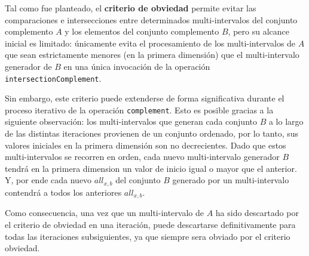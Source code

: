Tal como fue planteado, el \textbf{criterio de obviedad} permite evitar las comparaciones e intersecciones entre determinados multi-intervalos del conjunto complemento $A$ y los elementos del conjunto complemento $B$, pero su alcance inicial es limitado: únicamente evita el procesamiento de los multi-intervalos de $A$ que sean estrictamente menores (en la primera dimensión) que el multi-intervalo generador de $B$ en una única invocación de la operación \texttt{intersectionComplement}.

Sin embargo, este criterio puede extenderse de forma significativa durante el proceso iterativo de la operación \texttt{complement}. Esto es posible gracias a la siguiente observación: los multi-intervalos que generan cada conjunto $B$ a lo largo de las distintas iteraciones provienen de un conjunto ordenado, por lo tanto, sus valores iniciales en la primera dimensión son no decrecientes. Dado que estos multi-intervalos se recorren en orden, cada nuevo multi-intervalo generador $B$ tendrá en la primera dimension un valor de inicio igual o mayor que el anterior. Y, por ende cada nuevo $\textit{all}_{x,b}$ del conjunto $B$ generado por un multi-intervalo contendrá a todos los anteriores $\textit{all}_{x,b}$.

Como consecuencia, una vez que un multi-intervalo de $A$ ha sido descartado por el criterio de obviedad en una iteración, puede descartarse definitivamente para todas las iteraciones subsiguientes, ya que siempre sera obviado por el criterio obviedad.


